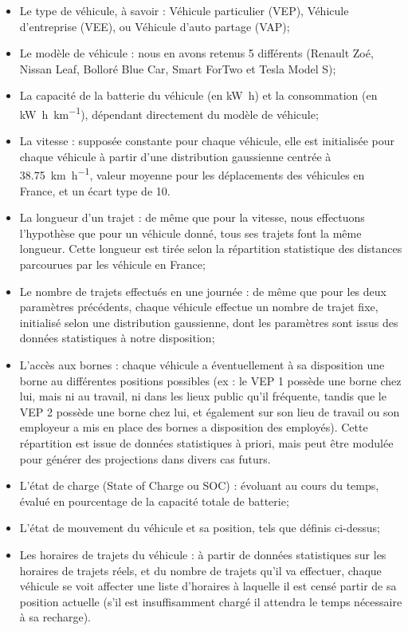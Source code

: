 		\begin{itemize}
			\item Le type de véhicule, à savoir : Véhicule particulier (VEP), Véhicule d'entreprise (VEE), ou Véhicule d'auto partage (VAP);
			\item Le modèle de véhicule : nous en avons retenus 5 différents (Renault Zoé, Nissan Leaf, Bolloré Blue Car, Smart ForTwo et Tesla Model S);
			\item La capacité de la batterie du véhicule (en \si{\kilo\watt\hour}) et la consommation (en \si{\kilo\watt\hour\per\kilo\meter}), dépendant directement du modèle de véhicule;
			\item La vitesse : supposée constante pour chaque véhicule, elle est initialisée pour chaque véhicule à partir d'une distribution gaussienne centrée à \SI{38,75}{\kilo\meter\per\hour}, valeur moyenne pour les déplacements des véhicules en France, et un écart type de 10.
			\item La longueur d'un trajet : de même que pour la vitesse, nous effectuons l'hypothèse que pour un véhicule donné, tous ses trajets font la même longueur. Cette longueur est tirée selon la répartition statistique des distances parcourues par les véhicule en France;
			\item Le nombre de trajets effectués en une journée : de même que pour les deux paramètres précédents, chaque véhicule effectue un nombre de trajet fixe, initialisé selon une distribution gaussienne, dont les paramètres sont issus des données statistiques à notre disposition;
			\item L'accès aux bornes : chaque véhicule a éventuellement à sa disposition une borne au différentes positions possibles (ex : le VEP \no{}1 possède une borne chez lui, mais ni au travail, ni dans les lieux public qu'il fréquente, tandis que le VEP \no{}2 possède une borne chez lui, et également sur son lieu de travail ou son employeur a mis en place des bornes a disposition des employés). Cette répartition est issue de données statistiques à priori, mais peut être modulée pour générer des projections dans divers cas futurs.  
			\item L'état de charge (State of Charge ou SOC) : évoluant au cours du temps, évalué en pourcentage de la capacité totale de batterie;
			\item L'état de mouvement du véhicule et sa position, tels que définis ci-dessus;
			\item Les horaires de trajets du véhicule : à partir de données statistiques sur les horaires de trajets réels, et du nombre de trajets qu'il va effectuer, chaque véhicule se voit affecter une liste d'horaires à laquelle il est censé partir de sa position actuelle (s'il est insuffisamment chargé il attendra le temps nécessaire à sa recharge).
		\end{itemize}
		
